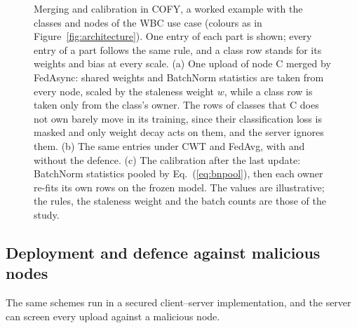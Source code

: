 \documentclass[pdflatex,sn-mathphys-num]{sn-jnl}
\newcommand{\sys}{COFY}
\begin{document}
\begin{figure}[!p]
\centering

\caption{Merging and calibration in \sys{}, a worked example with the classes and nodes of the WBC use case (colours as in Figure~\ref{fig:architecture}). One entry of each part is shown; every entry of a part follows the same rule, and a class row stands for its weights and bias at every scale. (a) One upload of node C merged by FedAsync: shared weights and BatchNorm statistics are taken from every node, scaled by the staleness weight $w$, while a class row is taken only from the class's owner. The rows of classes that C does not own barely move in its training, since their classification loss is masked and only weight decay acts on them, and the server ignores them. (b) The same entries under CWT and FedAvg, with and without the defence. (c) The calibration after the last update: BatchNorm statistics pooled by Eq.~(\ref{eq:bnpool}), then each owner re-fits its own rows on the frozen model. The values are illustrative; the rules, the staleness weight and the batch counts are those of the study.}\label{fig:merge}
\end{figure}

\subsection{Deployment and defence against malicious nodes}\label{sec:deploy}
The same schemes run in a secured client--server implementation, and the server can screen every upload against a malicious node.
\end{document}
